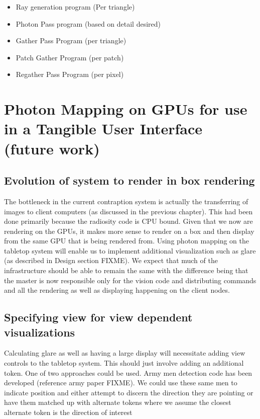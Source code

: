   \begin{itemize}
    \item Ray generation program (Per triangle)
    \item Photon Pass program (based on detail desired)
    \item Gather Pass Program (per triangle)
    \item Patch Gather Program (per patch)
    \item Regather Pass Program (per pixel)
  \end{itemize}  
  
  
  \section{Photon Mapping on GPUs for use in a Tangible User Interface (future work)}
    \subsection{Evolution of system to render in box rendering}
    The bottleneck in the current contraption system is actually the transferring of images to client computers (as discussed in the previous chapter).  This had been done primarily because the radiosity code is CPU bound.  Given that we now are rendering on the GPUs, it makes more sense to render on a box and then display from the same GPU that is being rendered from.  Using photon mapping on the tabletop system will enable us to implement additional visualization such as glare (as described in Design section FIXME).  We expect that much of the infrastructure should be able to remain the same with the difference being that the master is now responsible only for the vision code and distributing commands and all the rendering as well as displaying happening on the client nodes.
  \subsection{Specifying view for view dependent visualizations}
    Calculating glare as well as having a large display will necessitate adding view controls to the tabletop system.  This should just involve adding an additional token.  One of two approaches could be used.  Army men detection code has been developed (reference army paper FIXME).  We could use these same men to indicate position and either attempt to discern the direction they are pointing or have them matched up with alternate tokens where we assume the closest alternate token is the direction of interest

